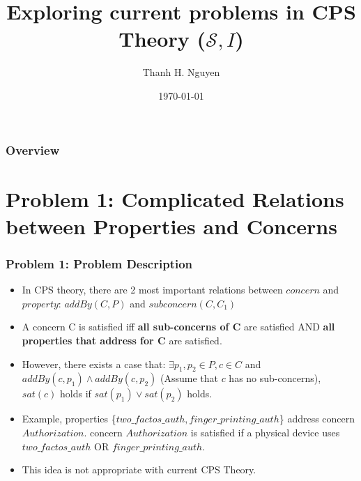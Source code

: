 \documentclass{beamer}
\title[Truthworthiness value]{Exploring current problems in CPS Theory ($\mathcal{S},I$)} %
\author{Thanh H. Nguyen} %
\institute[NMSU] %
{
New Mexico State University \\ %
\medskip
\textit{tnguyen@cs.nmsu.edu} %
}
\date{\today} %
\begin{document}
\begin{frame}
\titlepage %
\end{frame}


\begin{frame}
\frametitle{Overview} %
\tableofcontents %
\end{frame}


\section{Problem 1: Complicated Relations between Properties and Concerns} 
\begin{frame}
	\frametitle{Problem 1: Problem Description}
	\begin{itemize}
		\item In CPS theory, there are 2 most important relations between $concern$ and $property$: $addBy(C,P)$ and $subconcern(C,C_1)$
		\item A concern C is satisfied iff {\bf all sub-concerns of C} are satisfied AND {\bf all properties that address for C} are satisfied.
		\item However, there exists a case that: $\exists p_1,p_2 \in P, c \in C$ and $addBy(c,p_1) \land addBy(c,p_2)$ (Assume that $c$ has no sub-concerns), $sat(c)$ holds if $sat(p_1) \lor sat(p_2)$ holds.
		\item Example, properties \{$two\_factos\_auth, finger\_printing\_auth$\} address concern $Authorization$.  concern $Authorization$ is satisfied if a physical device uses $two\_factos\_auth$ OR $finger\_printing\_auth$. 
		\item This idea is not appropriate with current CPS Theory.
	\end{itemize}
\end{frame}
\end{document}

